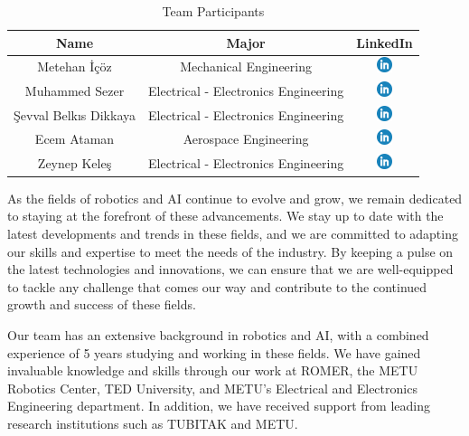 \documentclass{article}
\begin{document}
\begin{table}[hbt!]
\centering
\begin{tabular}{|c|c|c|}
    \hline
    Name & Major & LinkedIn \\
    \hline
    Metehan İçöz & Mechanical Engineering & \href{https://www.linkedin.com/in/metehan-içöz-735bab206/}{\includegraphics[height=1.2em]{linkedin.png}} \\
    Muhammed Sezer & Electrical - Electronics Engineering & \href{https://www.linkedin.com/in/muhammed-sezer-160428208/}{\includegraphics[height=1.2em]{linkedin.png}} \\
    Şevval Belkıs Dikkaya & Electrical - Electronics Engineering & \href{https://www.linkedin.com/in/sbdikkaya/}{\includegraphics[height=1.2em]{linkedin.png}} \\
    Ecem Ataman & Aerospace Engineering & \href{https://www.linkedin.com/in/ecemataman/}{\includegraphics[height=1.2em]{linkedin.png}} \\
    Zeynep Keleş & Electrical - Electronics Engineering & \href{https://www.linkedin.com/in/zeynep-bilge-keleş-7ba917255/}{\includegraphics[height=1.2em]{linkedin.png}} \\
    \hline
\end{tabular}
\caption[short]{Team Participants}
\end{table}

As the fields of robotics and AI continue to evolve and grow, we remain dedicated to staying at the forefront of these advancements. We stay up to date with the latest developments and trends in these fields, and we are committed to adapting our skills and expertise to meet the needs of the industry. By keeping a pulse on the latest technologies and innovations, we can ensure that we are well-equipped to tackle any challenge that comes our way and contribute to the continued growth and success of these fields.

Our team has an extensive background in robotics and AI, with a combined experience of 5 years studying and working in these fields. We have gained invaluable knowledge and skills through our work at ROMER, the METU Robotics Center, TED University, and METU's Electrical and Electronics Engineering department. In addition, we have received support from leading research institutions such as TUBITAK and METU. 
\end{document}
